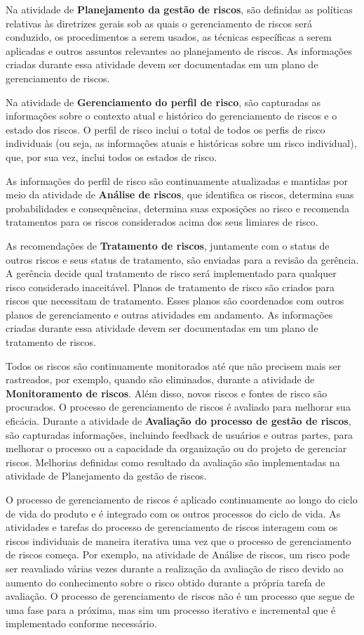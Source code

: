\documentclass[
	12pt,
	openright,
	twoside,
	a4paper,
	english,
	brazil
	]{abntex2}
\begin{document}
Na atividade de \textbf{Planejamento da gestão de riscos}, são definidas as políticas relativas às diretrizes gerais sob as quais o gerenciamento de riscos será conduzido, os procedimentos a serem usados, as técnicas específicas a serem aplicadas e outros assuntos relevantes ao planejamento de riscos. As informações criadas durante essa atividade devem ser documentadas em um plano de gerenciamento de riscos.

Na atividade de \textbf{Gerenciamento do perfil de risco}, são capturadas as informações sobre o contexto atual e histórico do gerenciamento de riscos e o estado dos riscos. O perfil de risco inclui o total de todos os perfis de risco individuais (ou seja, as informações atuais e históricas sobre um risco individual), que, por sua vez, inclui todos os estados de risco.

As informações do perfil de risco são continuamente atualizadas e mantidas por meio da atividade de \textbf{Análise de riscos}, que identifica os riscos, determina suas probabilidades e consequências, determina suas exposições ao risco e recomenda tratamentos para os riscos considerados acima dos seus limiares de risco. 

As recomendações de \textbf{Tratamento de riscos}, juntamente com o status de outros riscos e seus status de tratamento, são enviadas para a revisão da gerência. A gerência decide qual tratamento de risco será implementado para qualquer risco considerado inaceitável. Planos de tratamento de risco são criados para riscos que necessitam de tratamento. Esses planos são coordenados com outros planos de gerenciamento e outras atividades em andamento. As informações criadas durante essa atividade devem ser documentadas em um plano de tratamento de riscos.

Todos os riscos são continuamente monitorados até que não precisem mais ser rastreados, por exemplo, quando são eliminados, durante a atividade de \textbf{Monitoramento de riscos}. Além disso, novos riscos e fontes de risco são procurados. O processo de gerenciamento de riscos é avaliado para melhorar sua eficácia. Durante a atividade de \textbf{Avaliação do processo de gestão de riscos}, são capturadas informações, incluindo feedback de usuários e outras partes, para melhorar o processo ou a capacidade da organização ou do projeto de gerenciar riscos. Melhorias definidas como resultado da avaliação são implementadas na atividade de Planejamento da gestão de riscos.

O processo de gerenciamento de riscos é aplicado continuamente ao longo do ciclo de vida do produto e é integrado com os outros processos do ciclo de vida. As atividades e tarefas do processo de gerenciamento de riscos interagem com os riscos individuais de maneira iterativa uma vez que o processo de gerenciamento de riscos começa. Por exemplo, na atividade de Análise de riscos, um risco pode ser reavaliado várias vezes durante a realização da avaliação de risco devido ao aumento do conhecimento sobre o risco obtido durante a própria tarefa de avaliação. O processo de gerenciamento de riscos não é um processo que segue de uma fase para a próxima, mas sim um processo iterativo e incremental que é implementado conforme necessário.
\end{document}
